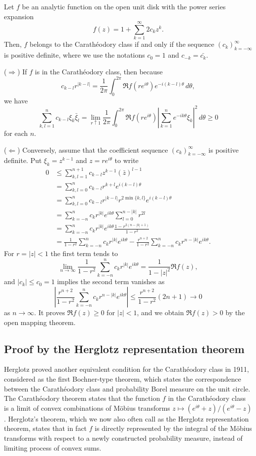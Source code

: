 \documentclass[a4paper]{article}
\begin{document}
\begin{thm}
Let $f$ be an analytic function on the open unit disk with the power series expansion
\[f(z)=1+\sum_{k=1}^\infty2c_kz^k.\]
Then, $f$ belongs to the Carath\'eodory class if and only if the sequence $(c_k)_{k=-\infty}^\infty$ is positive definite, where we use the notations $c_0=1$ and $c_{-k}=\bar{c_k}$.
\end{thm}
\begin{pf}
($\Rightarrow$)
If $f$ is in the Carath\'eodory class, then because
\[c_{k-l}r^{|k-l|}=\frac1{2\pi}\int_0^{2\pi}\Re f(re^{i\theta})e^{-i(k-l)\theta}\,d\theta,\]
we have
\[\sum_{k,l=1}^nc_{k-l}\xi_k\bar\xi_l
=\lim_{r\uparrow1}\frac1{2\pi}\int_0^{2\pi}\Re f(re^{i\theta})\left|\sum_{k=1}^ne^{-ik\theta}\xi_k\right|^2\,d\theta\ge0\]
for each $n$.

($\Leftarrow$)
Conversely, assume that the coefficient sequence $(c_k)_{k=-\infty}^\infty$ is positive definite.
Put $\xi_k=z^{k-1}$ and $z=re^{i\theta}$ to write
\begin{align*}
0&\le\sum_{k,l=1}^{n+1}c_{k-l}z^{k-1}(\bar z)^{l-1}\\
&=\sum_{k,l=0}^nc_{k-l}r^{k+l}e^{i(k-l)\theta}\\
&=\sum_{k,l=0}^nc_{k-l}r^{|k-l|}r^{2\min\{k,l\}}e^{i(k-l)\theta}\\
&=\sum_{k=-n}^nc_kr^{|k|}e^{ik\theta}\sum_{l=0}^{n-|k|}r^{2l}\\
&=\sum_{k=-n}^nc_kr^{|k|}e^{ik\theta}\frac{1-r^{2(n-|k|+1)}}{1-r^2}\\
&=\frac1{1-r^2}\sum_{k=-n}^nc_kr^{|k|}e^{ik\theta}
-\frac{r^{n+2}}{1-r^2}\sum_{k=-n}^nc_kr^{n-|k|}e^{ik\theta}.
\end{align*}
For $r=|z|<1$ the first term tends to
\[\lim_{n\to\infty}\frac1{1-r^2}\sum_{k=-n}^nc_kr^{|k|}e^{ik\theta}=\frac1{1-|z|^2}\Re f(z),\]
and $|c_k|\le c_0=1$ implies the second term vanishes as
\[\left|\frac{r^{n+2}}{1-r^2}\sum_{k=-n}^nc_kr^{n-|k|}e^{ik\theta}\right|\le\frac{r^{n+2}}{1-r^2}(2n+1)\to0\]
as $n\to\infty$.
It proves $\Re f(z)\ge0$ for $|z|<1$, and we obtain $\Re f(z)>0$ by the open mapping theorem.
\end{pf}


\subsection{Proof by the Herglotz representation theorem}

Herglotz \cite{herglotz1911uber} proved another equivalent condition for the Carath\'eodory class in 1911, considered as the first Bochner-type theorem, which states the correspondence between the Carath\'eodory class and probability Borel measure on the unit circle.
The Carath\'eodory theorem states that the function $f$ in the Carath\'eodory class is a limit of convex combinations of M\"obius transforms $z\mapsto(e^{i\theta}+z)/(e^{i\theta}-z)$.
Herglotz's theorem, which we now also often call as the Herglotz representation theorem, states that in fact $f$ is directly represented by the integral of the M\"obius transforms with respect to a newly constructed probability measure, instead of limiting process of convex sums.
\end{document}
